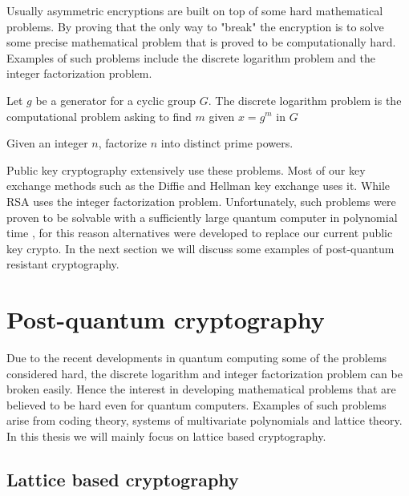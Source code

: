 Usually asymmetric encryptions are built on top of some hard mathematical
problems. By proving that the only way to "break" the encryption is to solve
some precise mathematical problem that is proved to be computationally hard.
Examples of such problems include the discrete logarithm problem and the
integer factorization problem.

\begin{definition}

    Let $g$ be a generator for a cyclic group $G$. The discrete logarithm
    problem is the computational problem asking to find $m$ given $x = g^m$ in
    $G$

\end{definition}

\begin{definition}

    Given an integer $n$, factorize $n$ into distinct prime powers.

\end{definition}

Public key cryptography extensively use these problems. Most of our key
exchange methods such as the Diffie and Hellman key exchange uses it. While RSA
uses the integer factorization problem. Unfortunately, such problems were
proven to be solvable with a sufficiently large quantum computer in
polynomial time \citep{ShorQuantum}, for this reason alternatives were
developed to replace our current public key crypto. In the next section we will
discuss some examples of post-quantum resistant cryptography.


\section{Post-quantum cryptography}

Due to the recent developments in quantum computing some of the problems
considered hard, the discrete logarithm and integer factorization problem can
be broken easily. Hence the interest in developing mathematical problems that
are believed to be hard even for quantum computers. Examples of such problems
arise from coding theory, systems of multivariate polynomials and lattice
theory. In this thesis we will mainly focus on lattice based cryptography.


\subsection{Lattice based cryptography}

